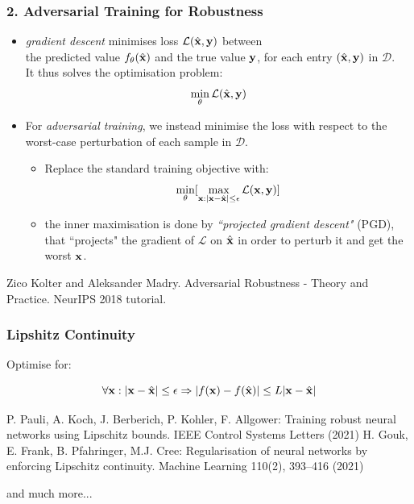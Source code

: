 \documentclass[t,compress,aspectratio=169]{beamer}
\newcommand{\distance}[2]{|#1 - #2|}
\newcommand{\xs}{\x} 			%
\begin{document}
\begin{frame}
  \frametitle{2. Adversarial Training  for Robustness}

\vspace{-2em}
  \begin{itemize}
  \item  \emph{gradient descent}  minimises loss $\mathcal{L}(\hat{\mathbf{x}}, \mathbf{y})$ between\\ the predicted value $f_{\theta}(\hat{\mathbf{x}})$ and the true value $\mathbf{y}$, for each entry $(\hat{\mathbf{x}}, \mathbf{y})$ in $\mathcal{D}$.\\ It thus solves the optimisation problem:
  $$ \min_{\theta} \mathcal{L}(\hat{\mathbf{x}}, \mathbf{y}) $$
  \pause
  \item For \emph{adversarial training}, we instead minimise the loss with respect to the worst-case perturbation of each sample in $\mathcal{D}$.
\begin{itemize}
     \item Replace the standard training objective with:
$$\min_{\theta} [ \max_{\xs : \distance{\xs}{\xt} \leq \epsilon} \lossfn(\xs, \y)]$$
 \item the inner maximisation is done by \emph{``projected gradient descent"} (PGD), that ``projects" the gradient of $\mathcal{L}$ on $\hat{\mathbf{x}}$ in order to perturb it and get the worst $\xs$.

\end{itemize}
\end{itemize}

 {\scriptsize
   \begin{thebibliography}{99}
        \beamertemplatearticlebibitems
    Zico Kolter and Aleksander Madry. Adversarial Robustness - Theory and Practice. NeurIPS 2018 tutorial.

 \end{thebibliography}}

\end{frame}


    \begin{frame}
      \frametitle{ Lipshitz Continuity}

      Optimise for:

  \begin{equation*}
    \label{eq:lipschitz-robustness}
    \forall \xs: \distance{\xs}{\xt} \leq \epsilon \Rightarrow \distance{f(\xs)}{f(\xt)} \leq L \distance{\xs}{\xt}
  \end{equation*}

   {\scriptsize
   \begin{thebibliography}{99}
        \beamertemplatearticlebibitems
P. Pauli, A. Koch, J. Berberich, P. Kohler, F. Allgower: Training robust neural networks
using Lipschitz bounds. IEEE Control Systems Letters (2021)
 H. Gouk, E. Frank, B. Pfahringer, M.J. Cree: Regularisation of neural networks by enforcing Lipschitz continuity. Machine Learning 110(2), 393–416 (2021)
\end{thebibliography}}


and much more...

    \end{frame}
\end{document}
